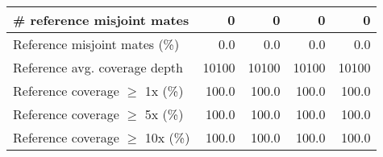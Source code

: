 \documentclass[12pt,a4paper]{article}
\begin{document}
\begin{table}[ht]
\begin{center}
\begin{tabular}{|l*{4}{|r}|}
\# reference misjoint mates & 0 & 0 & 0 & 0 \\ \hline
Reference misjoint mates (\%) & 0.0 & 0.0 & 0.0 & 0.0 \\ \hline
Reference avg. coverage depth & 10100 & 10100 & 10100 & 10100 \\ \hline
Reference coverage $\geq$ 1x (\%) & 100.0 & 100.0 & 100.0 & 100.0 \\ \hline
Reference coverage $\geq$ 5x (\%) & 100.0 & 100.0 & 100.0 & 100.0 \\ \hline
Reference coverage $\geq$ 10x (\%) & 100.0 & 100.0 & 100.0 & 100.0 \\ \hline
\end{tabular}
\end{center}
\end{table}
\end{document}
